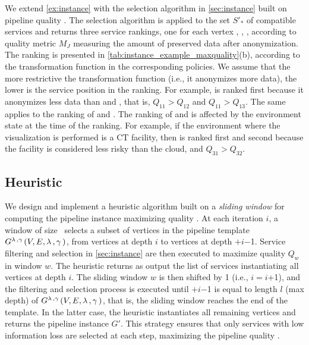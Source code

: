 \vspace{0.5em}

\begin{example}
  We extend \cref{ex:instance} with the selection algorithm in \cref{sec:instance} built on pipeline quality \q. The selection algorithm is applied to the set $S'_*$ of compatible services and returns three service rankings, one for each vertex , , , according to quality metric $M_J$ measuring the amount of preserved data after anonymization. The ranking is presented in \cref{tab:instance_example_maxquality}(b), according to the transformation function in the corresponding policies.
  We assume that the more restrictive the transformation function (i.e., it anonymizes more data), the lower is the service position in the ranking.
  For example,  is ranked first because it anonymizes less data than  and , that is, $Q_{11}$$>$$Q_{12}$ and $Q_{11}$$>$$Q_{13}$.  The same applies to the ranking of  and .
  The ranking of  and  is affected by the environment state at the time of the ranking.   For example, if the environment where the visualization is performed is a CT facility, then  is ranked first and  second because the facility is considered less risky than the cloud, and $Q_{31}$$>$$Q_{32}$.
\end{example}

\subsection{Heuristic}\label{subsec:heuristics}
We design and implement a heuristic algorithm built on a \emph{sliding window} for computing the pipeline instance maximizing quality \q.
At each iteration $i$, a window of size \windowsize\ selects a subset of vertices in the pipeline template $G^{\lambda\,,\gamma\,}(V,E,\lambda\,,\gamma\,)$, from vertices at depth $i$ to vertices at depth \windowsize$+$$i$$-$1.
Service filtering and selection in \cref{sec:instance} are then executed to maximize quality $Q_w$ in window $w$. The heuristic returns as output the list of services instantiating all vertices at depth $i$. The sliding window $w$ is then shifted by 1 (i.e., $i$$=$$i$+1), and the filtering and selection process is executed until \windowsize$+$$i$$-$1 is equal to length $l$ (max depth) of $G^{\lambda\,,\gamma\,}(V,E,\lambda\,,\gamma\,)$, that is, the sliding window reaches the end of the template. In the latter case, the heuristic instantiates all remaining vertices and returns the pipeline instance $G'$.
This strategy ensures that only services with low information loss are selected at each step, maximizing the pipeline quality \q.

